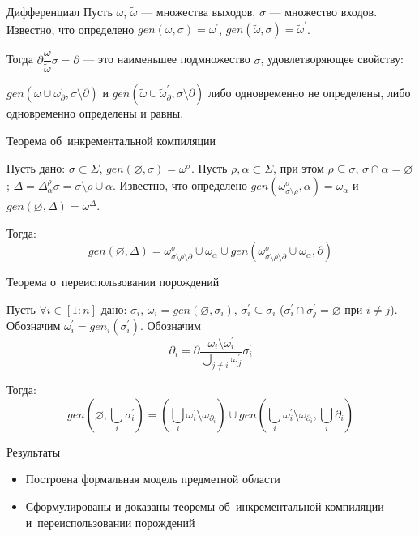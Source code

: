 \begin{frame}{Дифференциал}
Пусть $\omega$, $\tilde{\omega}$ --- множества выходов, $\sigma$ --- множество входов. Известно, что определено $gen(\omega, \sigma) = \omega^\prime$, $gen(\tilde{\omega}, \sigma) = \tilde{\omega}^\prime$.

Тогда $\partial\dfrac{\omega}{\tilde{\omega}}\sigma = \partial$ --- это наименьшее подмножество $\sigma$, удовлетворяющее свойству: 

$gen(\omega \cup \omega^\prime_{\partial}, \sigma\setminus\partial)$ и
$gen(\tilde{\omega} \cup \tilde{\omega}^\prime_{\partial}, \sigma\setminus\partial)$ либо одновременно не определены, либо одновременно определены и равны. 
\end{frame}

\begin{frame}{Теорема об~инкрементальной компиляции}

Пусть дано: $\sigma \subset \Sigma$, $gen(\varnothing, \sigma) = \omega^\sigma$. Пусть $\rho, \alpha \subset \Sigma$, при этом $\rho \subseteq \sigma$, $\sigma \cap \alpha = \varnothing$; $\Delta = \Delta^\rho_\alpha\sigma = \sigma\setminus\rho\cup\alpha$. Известно, что определено $gen(\omega^\sigma_{\sigma\setminus\rho}, \alpha) = \omega_\alpha$ и $gen(\varnothing, \Delta) = \omega^\Delta$.\\

\pause

Тогда:
$$gen(\varnothing, \Delta) = \omega^\sigma_{\sigma\setminus\rho\setminus\partial} \cup \omega_\alpha \cup gen(\omega^\sigma_{\sigma\setminus\rho\setminus\partial} \cup \omega_\alpha, \partial)$$

\end{frame}

\begin{frame}{Теорема о~переиспользовании порождений}

Пусть $\forall i \in [1:n]$ дано: $\sigma_i$, $\omega_i = gen(\varnothing, \sigma_i)$, $\sigma_i^\prime \subseteq \sigma_i$ ($\sigma_i^\prime \cap \sigma_j^\prime = \varnothing$ при $i \neq j$). Обозначим $\omega_i^\prime = gen_i(\sigma_i^\prime)$. Обозначим 
$$\partial_i = \partial\dfrac{\omega_i \setminus \omega_i^\prime}{\bigcup\limits_{j \neq i} \omega_j^\prime} \sigma_i^\prime$$

\pause

Тогда:
$$gen(\varnothing, \bigcup\limits_i \sigma_i^\prime) = \left( \bigcup\limits_i \omega_i^\prime \setminus \omega_{\partial_i} \right) \cup gen(\bigcup\limits_i \omega_i^\prime \setminus \omega_{\partial_i}, \bigcup\limits_i \partial_i)$$

\end{frame}


\begin{frame}{Результаты}
\begin{itemize}
	\item Построена формальная модель предметной области
	\item Сформулированы и доказаны теоремы об~инкрементальной компиляции и~переиспользовании порождений
\end{itemize}
\end{frame}


